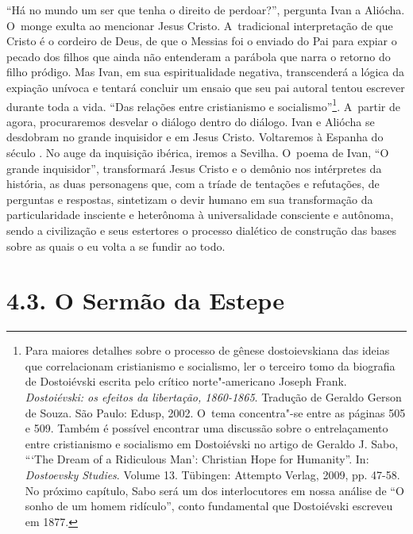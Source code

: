 ``Há no mundo um ser que tenha o direito de perdoar?'', pergunta Ivan a
Aliócha. O~monge exulta ao mencionar Jesus Cristo. A~tradicional
interpretação de que Cristo é o cordeiro de Deus, de que o Messias foi o
enviado do Pai para expiar o pecado dos filhos que ainda não entenderam
a parábola que narra o retorno do filho pródigo. Mas Ivan, em sua
espiritualidade negativa, transcenderá a lógica da expiação unívoca e
tentará concluir um ensaio que seu pai autoral tentou escrever durante
toda a vida. ``Das relações entre cristianismo e socialismo''\footnote{Para
  maiores detalhes sobre o processo de gênese dostoievskiana das ideias
  que correlacionam cristianismo e socialismo, ler o terceiro tomo da
  biografia de Dostoiévski escrita pelo crítico norte"-americano Joseph
  Frank. \emph{Dostoiévski: os efeitos da libertação, 1860-1865}.
  Tradução de Geraldo Gerson de Souza. São Paulo: Edusp, 2002. O~tema
  concentra"-se entre as páginas 505 e 509. Também é possível encontrar
  uma discussão sobre o entrelaçamento entre cristianismo e socialismo
  em Dostoiévski no artigo de Geraldo J. Sabo, ```The Dream of a
  Ridiculous Man': Christian Hope for Humanity''. In: \emph{Dostoevsky
  Studies}. Volume 13. Tübingen: Attempto Verlag, 2009, pp. 47-58. No
  próximo capítulo, Sabo será um dos interlocutores em nossa análise de
  ``O sonho de um homem ridículo'', conto fundamental que Dostoiévski
  escreveu em 1877.}. A~partir de agora, procuraremos desvelar o diálogo
dentro do diálogo. Ivan e Aliócha se desdobram no grande inquisidor e em
Jesus Cristo. Voltaremos à Espanha do século . No auge da inquisição
ibérica, iremos a Sevilha. O~poema de Ivan, ``O grande inquisidor'',
transformará Jesus Cristo e o demônio nos intérpretes da história, as
duas personagens que, com a tríade de tentações e refutações, de
perguntas e respostas, sintetizam o devir humano em sua transformação da
particularidade insciente e heterônoma à universalidade consciente e
autônoma, sendo a civilização e seus estertores o processo dialético de
construção das bases sobre as quais o eu volta a se fundir ao todo.

\section{4.3. O Sermão da Estepe}

